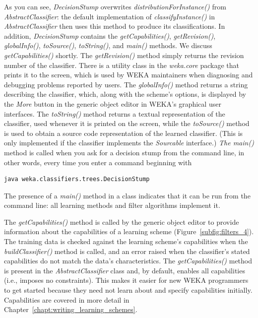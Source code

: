 As you can see, \textit{DecisionStump} overwrites
\textit{distributionForInstance()}
from \textit{AbstractClassifier}: the default implementation
of \textit{classifyInstance()} in \textit{AbstractClassifier} then
uses this method to produce its classifications. In addition, {\em DecisionStump}
contains the \textit{getCapabilities()}, \textit{getRevision()}, \textit{globalInfo()},
\textit{toSource()}, \textit{toString()}, and \textit{main()} methods. We discuss
\textit{getCapabilities()} shortly. The \textit{getRevision()} method simply returns the
revision number of the classifier. There is a utility class in the
\textit{weka.core} package that prints it to the screen, which is used by WEKA
maintainers when diagnosing and debugging problems reported by
users. The \textit{globalInfo()} method returns a string describing the
classifier, which, along with the scheme's options, is displayed by
the \textit{More} button in the generic object editor in WEKA's graphical user interfaces. The
\textit{toString()} method returns a textual representation of the classifier,
used whenever it is printed on the screen, while
the \textit{toSource()} method is used to obtain a source code
representation of the learned classifier. (This is only implemented if
the classifier implements the {\em Sourcable} interface.) \textit{The main()} method is called when
you ask for a decision stump from the command line, in other words,
every time you enter a command beginning with

\begin{Verbatim}[fontsize=\footnotesize]
java weka.classifiers.trees.DecisionStump
\end{Verbatim}

\noindent The presence of a \textit{main()} method in a class indicates that it
can be run from the command line: all learning methods and filter
algorithms implement it.

The \textit{getCapabilities()} method is called by the generic object
editor to provide information about the capabilities of a learning
scheme (Figure~\ref{subfig:filters_4}). The training data is checked
against the learning scheme's capabilities when
the \textit{buildClassifier()} method is called, and an error raised
when the classifier's stated capabilities do not match the data's
characteristics. The \textit{getCapabilities()} method is present in
the \textit{AbstractClassifier} class and, by default, enables all
capabilities (i.e., imposes no constraints). This makes it easier for
new WEKA programmers to get started because they need not learn about
and specify capabilities initially. Capabilities are covered in more
detail in Chapter~\ref{chapt:writing_learning_schemes}.

